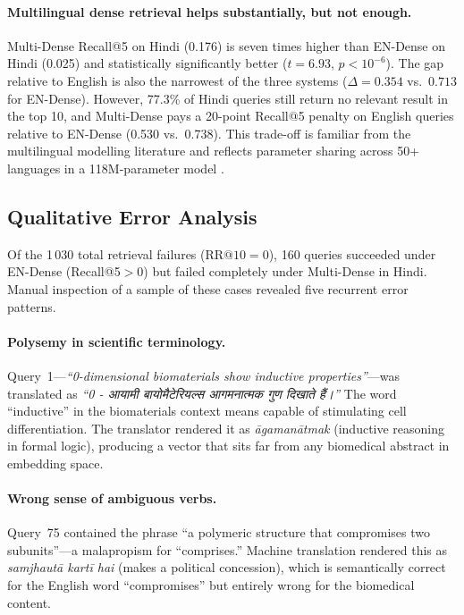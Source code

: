 \documentclass[acmsmall,screen,review]{acmart}
\begin{document}
\paragraph{Multilingual dense retrieval helps substantially, but not enough.}
Multi-Dense Recall@5 on Hindi (0.176) is seven times higher than
EN-Dense on Hindi (0.025) and statistically significantly better
($t = 6.93$, $p < 10^{-6}$).  The gap relative to English is also the
narrowest of the three systems ($\Delta = 0.354$ vs.\ $0.713$ for
EN-Dense).  However, 77.3\% of Hindi queries still return no relevant
result in the top 10, and Multi-Dense pays a 20-point Recall@5 penalty on
English queries relative to EN-Dense (0.530 vs.\ 0.738).  This trade-off
is familiar from the multilingual modelling literature and reflects
parameter sharing across 50+ languages in a 118M-parameter model
\citep{reimers2020multilingual,wang2020minilm}.

\subsection{Qualitative Error Analysis}
\label{sec:error-analysis}

Of the 1\,030 total retrieval failures ($\text{RR@10} = 0$), 160 queries
succeeded under EN-Dense (Recall@5$>$0) but failed completely under
Multi-Dense in Hindi.  Manual inspection of a sample of these cases
revealed five recurrent error patterns.

\paragraph{Polysemy in scientific terminology.}
Query~1---\emph{``0-dimensional biomaterials show inductive
properties''}---was translated as \emph{``0 - आयामी बायोमैटेरियल्स
आगमनात्मक गुण दिखाते हैं।''}  The word ``inductive'' in the biomaterials
context means capable of stimulating cell differentiation.  The
translator rendered it as \emph{āgamanātmak} (inductive reasoning in
formal logic), producing a vector that sits far from any biomedical
abstract in embedding space.

\paragraph{Wrong sense of ambiguous verbs.}
Query~75 contained the phrase ``a polymeric structure that compromises
two subunits''---a malapropism for ``comprises.''  Machine translation
rendered this as \emph{samjhautā kartī hai} (makes a political
concession), which is semantically correct for the English word
``compromises'' but entirely wrong for the biomedical content.
\end{document}

